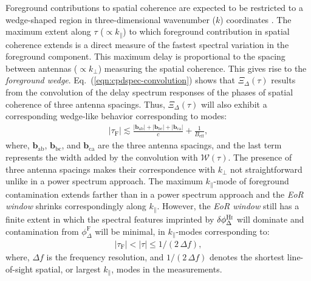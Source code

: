 \documentclass[
reprint,
superscriptaddress,
amsmath,
amssymb,
aps,
prd
]{revtex4-1}
\begin{document}
Foreground contributions to spatial coherence are expected to be restricted to a wedge-shaped region in three-dimensional wavenumber ($k$) coordinates \cite{bow09,liu09,liu14a,liu14b,dat10,liu11,gho12,mor12,par12b,tro12,ved12,dil13,pob13,thy13,thy15a,thy15b,thy16,dil14}. The maximum extent along $\tau$ ($\propto k_\parallel$) to which foreground contribution in spatial coherence extends is a direct measure of the fastest spectral variation in the foreground component. This maximum delay is proportional to the spacing between antennas ($\propto k_\perp$) measuring the spatial coherence. This gives rise to the {\it foreground wedge}. Eq.~(\ref{eqn:cpdspec-convolution}) shows that $\Xi_\Delta(\tau)$ results from the convolution of the delay spectrum responses of the phases of spatial coherence of three antenna spacings. Thus, $\Xi_\Delta(\tau)$ will also exhibit a corresponding wedge-like behavior corresponding to modes:
\begin{align}
  |\tau_\textrm{F}| \lesssim \frac{|\bm{b}_\textrm{ab}| + |\bm{b}_\textrm{bc}| + |\bm{b}_\textrm{ca}|}{c} + \frac{1}{B_\textrm{eff}}, \label{eqn:cp-FG-wedge}
\end{align}
where, $\bm{b}_\textrm{ab}$, $\bm{b}_\textrm{bc}$, and $\bm{b}_\textrm{ca}$ are the three antenna spacings, and the last term represents the width added by the convolution with $\mathcal{W}(\tau)$. The presence of three antenna spacings makes their correspondence with $k_\perp$ not straightforward unlike in a power spectrum approach. The maximum $k_\parallel$-mode of foreground contamination extends farther than in a power spectrum approach and the {\it EoR window} shrinks  correspondingly along $k_\parallel$. However, the {\it EoR window} still has a finite extent in which the spectral features imprinted by $\delta\phi_\Delta^\textrm{H{\sc i}}$ will dominate and contamination from $\phi_\Delta^\textrm{F}$ will be minimal, in $k_\parallel$-modes corresponding to:
\begin{align}
  |\tau_\textrm{F}| < |\tau| \leq 1/(2\,\Delta f), \label{eqn:cp-EoR-window}
\end{align}
where, $\Delta f$ is the frequency resolution, and $1/(2\,\Delta f)$ denotes the shortest line-of-sight spatial, or largest $k_\parallel$, modes in the measurements.
\end{document}
